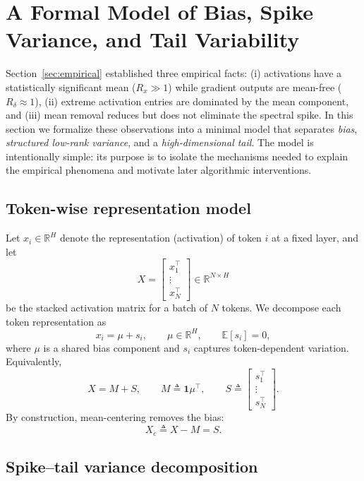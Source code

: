 \section{A Formal Model of Bias, Spike Variance, and Tail Variability}
\label{sec:formal_model}

Section~\ref{sec:empirical} established three empirical facts:
(i) activations have a statistically significant mean ($R_x\gg 1$) while gradient
outputs are mean-free ($R_\delta\approx 1$),
(ii) extreme activation entries are dominated by the mean component,
and (iii) mean removal reduces but does not eliminate the spectral spike.
In this section we formalize these observations into a minimal model that
separates \emph{bias}, \emph{structured low-rank variance}, and a
\emph{high-dimensional tail}.
The model is intentionally simple: its purpose is to isolate the mechanisms
needed to explain the empirical phenomena and motivate later algorithmic
interventions.

\subsection{Token-wise representation model}
\label{subsec:model_token}

Let $x_i \in \mathbb{R}^H$ denote the representation (activation) of token $i$
at a fixed layer, and let
\[
X = \begin{bmatrix} x_1^\top \\ \vdots \\ x_N^\top \end{bmatrix}\in\mathbb{R}^{N\times H}
\]
be the stacked activation matrix for a batch of $N$ tokens.
We decompose each token representation as
\begin{equation}
\label{eq:x_decompose}
x_i = \mu + s_i,
\qquad
\mu \in \mathbb{R}^H,
\qquad
\mathbb{E}[s_i]=0,
\end{equation}
where $\mu$ is a shared bias component and $s_i$ captures token-dependent
variation.
Equivalently,
\[
X = M + S,
\qquad
M \triangleq \mathbf{1}\mu^\top,
\qquad
S \triangleq \begin{bmatrix} s_1^\top \\ \vdots \\ s_N^\top \end{bmatrix}.
\]
By construction, mean-centering removes the bias:
\[
X_c \triangleq X - M = S.
\]

\subsection{Spike--tail variance decomposition}
\label{subsec:model_spike_tail}

